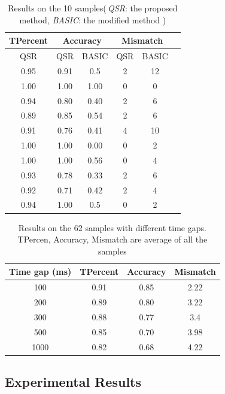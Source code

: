 \documentclass[letterpaper]{article}
\begin{document}
\begin{table}[t!]
\caption{Results on the 10 samples(\,\emph{QSR}: the proposed method, \emph{BASIC}: the modified method )}\label{empiResults}
\centering
\begin{tabular}{c|c|c|c|c|c}
\hline
{TPercent} & \multicolumn{2}{c}{Accuracy} & \multicolumn{2}{c}{Mismatch}\\
\hline
QSR  & QSR & BASIC & QSR & BASIC\\
\hline
0.95& 0.91 & 0.5 & 2 & 12\\
1.00&1.00 & 1.00 & 0 & 0\\
0.94&0.80 & 0.40 & 2 & 6\\
0.89&0.85 & 0.54 & 2 & 6\\
0.91&0.76 & 0.41 & 4 & 10\\
1.00&1.00 & 0.00 & 0 & 2\\
1.00&1.00 & 0.56 & 0 & 4\\
0.93&0.78 & 0.33 & 2 & 6 \\
0.92&0.71 & 0.42 & 2 & 4\\
0.94&1.00 & 0.5 & 0 & 2\\
\hline
\end{tabular}
\vspace{-5mm}
\end{table}

\begin{table}[t!]
\caption{Results on the 62 samples with different time gaps. TPercen, Accuracy, Mismatch are average of all the samples }\label{empiResults_2}
\centering
\begin{tabular}{c|c|c|c}
\hline
Time gap (ms) & TPercent & Accuracy & Mismatch\\
\hline
100 & 0.91 & 0.85 & 2.22\\
200 & 0.89 & 0.80 & 3.22\\
300 & 0.88 & 0.77 & 3.4\\
500 & 0.85 & 0.70 & 3.98\\
1000 & 0.82 & 0.68 & 4.22\\
\hline
\end{tabular}
\vspace{-5mm}
\end{table}


\subsection{Experimental Results}
\end{document}

